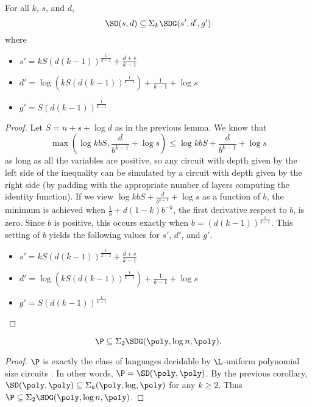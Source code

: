 \documentclass{article}
\begin{document}
\begin{corollary}
  For all $k$, $s$, and $d$,
  \begin{equation*}
    \SD(s, d) \subseteq \Sigma_k \SDG(s', d', g') %
  \end{equation*}
  where
  \begin{itemize}
  \item $s' = k S (d (k - 1))^{\frac{1}{k - 1}} + \frac{d + s}{k - 1}$
  \item $d' = \log\left(k S (d (k - 1))^{\frac{1}{k - 1}}\right) + \frac{1}{k - 1} + \log s$
  \item $g' = S (d (k - 1))^{\frac{1}{k - 1}}$
  \end{itemize}
\end{corollary}
\begin{proof}
  Let $S = n + s + \log d$ as in the previous lemma.
  We know that
  \begin{equation*}
    \max(\log k b S, \frac{d}{b^{k - 1}} + \log s) \leq \log k b S + \frac{d}{b^{k - 1}} + \log s
  \end{equation*}
  as long as all the variables are positive, so any circuit with depth given by the left side of the inequality can be simulated by a circuit with depth given by the right side (by padding with the appropriate number of layers computing the identity function).
  If we view $\log k b S + \frac{d}{b^{k - 1}} + \log s$ as a function of $b$, the minimum is achieved when $\frac{1}{b} + d (1 - k) b^{-k}$, the first derivative respect to $b$, is zero.
  Since $b$ is positive, this occurs exactly when $b = (d (k - 1))^{\frac{1}{k - 1}}$.
  This setting of $b$ yields the following values for $s'$, $d'$, and $g'$.
  \begin{itemize}
  \item $s' = k S (d (k - 1))^{\frac{1}{k - 1}} + \frac{d + s}{k - 1}$
  \item $d' = \log\left(k S (d (k - 1))^{\frac{1}{k - 1}}\right) + \frac{1}{k - 1} + \log s$
  \item $g' = S (d (k - 1))^{\frac{1}{k - 1}}$ \qedhere
  \end{itemize}
\end{proof}

\begin{corollary}\label{cor:pinsigma2}
  \begin{equation*}
    \P \subseteq \Sigma_2 \SDG(\poly, \log n, \poly).
  \end{equation*}
\end{corollary}
\begin{proof}
  $\P$ is exactly the class of languages decidable by $\L$-uniform polynomial size circuits \autocite[Theorem~6.15]{ab09}.
  In other words, $\P = \SD(\poly, \poly)$.
  By the previous corollary, $\SD(\poly, \poly) \subseteq \Sigma_k (\poly, \log, \poly)$ for any $k \geq 2$.
  Thus $\P \subseteq \Sigma_2 \SDG(\poly, \log n, \poly)$.
\end{proof}
\end{document}
